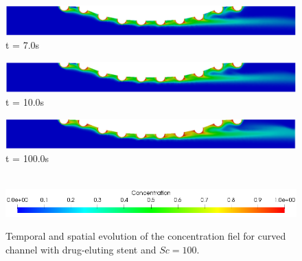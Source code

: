 \begin{figure}[H]
     \begin{minipage}{.50\linewidth}
      \centering
      \includegraphics[scale=0.18]{./02_chaps/cap_solution/figure/conc100_CurvedStrut6.png}\\
      t = 7.0s
     \end{minipage}
     \begin{minipage}{.50\linewidth}
     \medskip
      \centering
      \includegraphics[scale=0.18]{./02_chaps/cap_solution/figure/conc100_CurvedStrut7.png}\\
      t = 10.0s
     \end{minipage}%
     \begin{minipage}{.50\linewidth}
     \medskip
      \centering
      \includegraphics[scale=0.18]{./02_chaps/cap_solution/figure/conc100_CurvedStrut8.png}\\
      t = 100.0s
     \end{minipage}\\[10pt]
      \centering
      \includegraphics[scale=0.5]{./02_chaps/cap_solution/figure/conc1_CurvedStrutScale.png}\\
     \medskip
    \caption{
Temporal and spatial evolution of the concentration fiel for curved channel with drug-eluting stent and $Sc=100$.}
     \label{conc field curved stent sc 100}
\end{figure}

